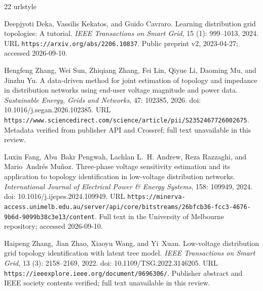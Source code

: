 \documentclass[UTF8,11pt,fontset=fandol,openany,oneside]{ctexbook}
\theoremstyle{definition}
\theoremstyle{remark}
\numberwithin{equation}{chapter}
\begin{document}

\backmatter

\begin{thebibliography}{22}
\providecommand{\natexlab}[1]{#1}
\providecommand{\url}[1]{\texttt{#1}}
\expandafter\ifx\csname urlstyle\endcsname\relax
  \providecommand{\doi}[1]{doi: #1}\else
  \providecommand{\doi}{doi: \begingroup \urlstyle{rm}\Url}\fi

Deepjyoti Deka, Vassilis Kekatos, and Guido Cavraro.
\newblock Learning distribution grid topologies: A tutorial.
\newblock \emph{IEEE Transactions on Smart Grid}, 15 (1):
  999--1013, 2024.
\newblock URL \url{https://arxiv.org/abs/2206.10837}.
\newblock Public preprint v2, 2023-04-27; accessed 2026-09-10.

Hengfeng Zhang, Wei Sun, Zhiqiang Zhang, Fei Lin, Qiyue Li, Daoming Mu, and
  Jinzhu Yu.
\newblock A data-driven method for joint estimation of topology and impedance
  in distribution networks using end-user voltage magnitude and power data.
\newblock \emph{Sustainable Energy, Grids and Networks}, 47: 102385,
  2026.
\newblock \doi{10.1016/j.segan.2026.102385}.
\newblock URL
  \url{https://www.sciencedirect.com/science/article/pii/S2352467726002675}.
\newblock Metadata verified from publisher API and Crossref; full text
  unavailable in this review.

Luxin Fang, Abu~Bakr Pengwah, Lachlan L.~H. Andrew, Reza Razzaghi, and
  Mario~Andr{\'e}s Mu{\~n}oz.
\newblock Three-phase voltage sensitivity estimation and its application to
  topology identification in low-voltage distribution networks.
\newblock \emph{International Journal of Electrical Power \& Energy Systems},
  158: 109949, 2024.
\newblock \doi{10.1016/j.ijepes.2024.109949}.
\newblock URL
  \url{https://minerva-access.unimelb.edu.au/server/api/core/bitstreams/26bfcb36-fcc3-4676-9b6d-9099b38c3e13/content}.
\newblock Full text in the University of Melbourne repository; accessed
  2026-09-10.

Haipeng Zhang, Jian Zhao, Xiaoyu Wang, and Yi~Xuan.
\newblock Low-voltage distribution grid topology identification with latent
  tree model.
\newblock \emph{IEEE Transactions on Smart Grid}, 13 (3):
  2158--2169, 2022.
\newblock \doi{10.1109/TSG.2022.3146205}.
\newblock URL \url{https://ieeexplore.ieee.org/document/9696306/}.
\newblock Publisher abstract and IEEE society contents verified; full text
  unavailable in this review.


\end{thebibliography}
\end{document}
